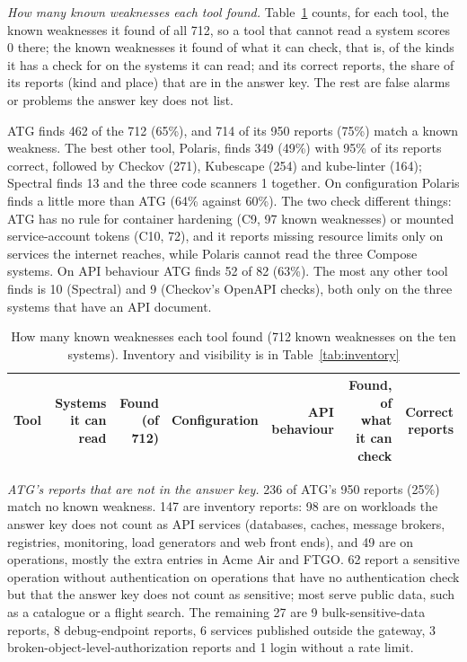 \textit{How many known weaknesses each tool found.} Table~\ref{tab:tools} counts, for each tool, the known weaknesses it found of all 712, so a tool that cannot read a system scores 0 there; the known weaknesses it found of what it can check, that is, of the kinds it has a check for on the systems it can read; and its correct reports, the share of its reports (kind and place) that are in the answer key. The rest are false alarms or problems the answer key does not list.

ATG finds 462 of the 712 (65\%), and 714 of its 950 reports (75\%) match a known weakness. The best other tool, Polaris, finds 349 (49\%) with 95\% of its reports correct, followed by Checkov (271), Kubescape (254) and kube-linter (164); Spectral finds 13 and the three code scanners 1 together. On configuration Polaris finds a little more than ATG (64\% against 60\%). The two check different things: ATG has no rule for container hardening (C9, 97 known weaknesses) or mounted service-account tokens (C10, 72), and it reports missing resource limits only on services the internet reaches, while Polaris cannot read the three Compose systems. On API behaviour ATG finds 52 of 82 (63\%). The most any other tool finds is 10 (Spectral) and 9 (Checkov's OpenAPI checks), both only on the three systems that have an API document.

\begin{table}[!t]
\caption{How many known weaknesses each tool found (712 known weaknesses on the ten systems). Inventory and visibility is in Table~\ref{tab:inventory}}
\label{tab:tools}
\centering
\scriptsize
\setlength{\tabcolsep}{4pt}
\begin{tabular}{@{}lrrrrrr@{}}
\toprule
Tool & Systems it can read & Found (of 712) & Configuration & API behaviour & Found, of what it can check & Correct reports \\
\midrule
\bottomrule
\end{tabular}
\end{table}

\textit{ATG's reports that are not in the answer key.} 236 of ATG's 950 reports (25\%) match no known weakness. 147 are inventory reports: 98 are on workloads the answer key does not count as API services (databases, caches, message brokers, registries, monitoring, load generators and web front ends), and 49 are on operations, mostly the extra entries in Acme Air and FTGO. 62 report a sensitive operation without authentication on operations that have no authentication check but that the answer key does not count as sensitive; most serve public data, such as a catalogue or a flight search. The remaining 27 are 9 bulk-sensitive-data reports, 8 debug-endpoint reports, 6 services published outside the gateway, 3 broken-object-level-authorization reports and 1 login without a rate limit.

